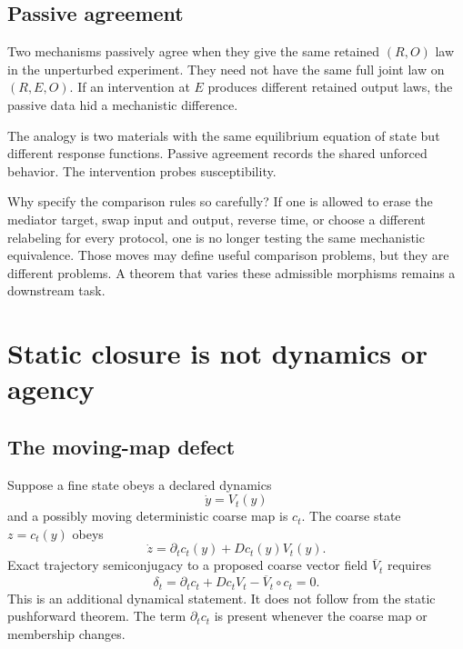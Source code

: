 \documentclass[11pt,letterpaper]{article}
\begin{document}
\subsection{Passive agreement}

Two mechanisms passively agree when they give the same retained \((R,O)\) law in the unperturbed experiment. They need not have the same full joint law on \((R,E,O)\). If an intervention at \(E\) produces different retained output laws, the passive data hid a mechanistic difference.

\begin{physicalreading}
The analogy is two materials with the same equilibrium equation of state but different response functions. Passive agreement records the shared unforced behavior. The intervention probes susceptibility.
\end{physicalreading}

Why specify the comparison rules so carefully? If one is allowed to erase the mediator target, swap input and output, reverse time, or choose a different relabeling for every protocol, one is no longer testing the same mechanistic equivalence. Those moves may define useful comparison problems, but they are different problems. A theorem that varies these admissible morphisms remains a downstream task.

\section{Static closure is not dynamics or agency}

\subsection{The moving-map defect}

Suppose a fine state obeys a declared dynamics
\[
  \dot y=V_t(y)
\]
and a possibly moving deterministic coarse map is \(c_t\). The coarse state \(z=c_t(y)\) obeys
\[
  \dot z
  =
  \partial_t c_t(y)+Dc_t(y)V_t(y).
\]
Exact trajectory semiconjugacy to a proposed coarse vector field \(\overline V_t\) requires
\begin{equation}
  \delta_t
  =
  \partial_t c_t+Dc_tV_t-\overline V_t\circ c_t
  =
  0.
  \label{eq:semiconjugacy}
\end{equation}
This is an additional dynamical statement. It does not follow from the static pushforward theorem. The term \(\partial_t c_t\) is present whenever the coarse map or membership changes.
\end{document}
